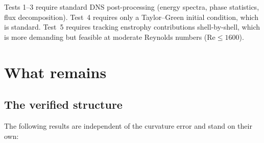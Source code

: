 \documentclass[11pt]{article}
\theoremstyle{definition}
\theoremstyle{remark}
\begin{document}
\bigskip
Tests 1--3 require standard DNS post-processing
(energy spectra, phase statistics, flux decomposition).
Test~4 requires only a Taylor--Green initial condition,
which is standard. Test~5 requires tracking enstrophy
contributions shell-by-shell, which is more demanding
but feasible at moderate Reynolds numbers
($\mathrm{Re} \leq 1600$).

\section{What remains}

\subsection{The verified structure}

The following results are independent of the curvature error and
stand on their own:
\end{document}
